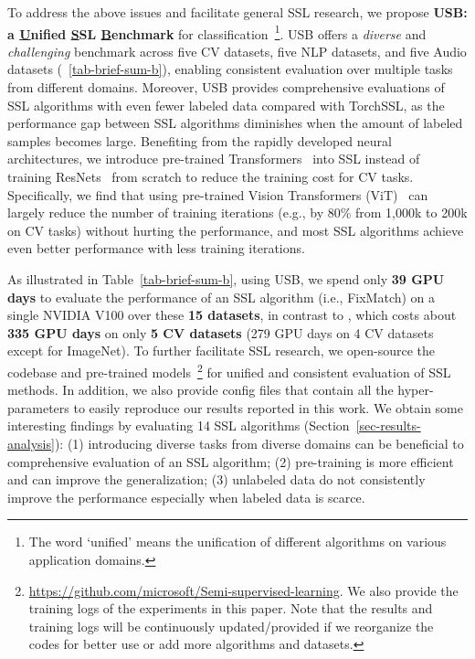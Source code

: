 \documentclass{article}
\newcommand{\revision}[1]{{\color{black}{#1}}}
\begin{document}
 

To address the above issues and facilitate general SSL research, we propose \textbf{USB: a \underline{U}nified \underline{S}SL \underline{B}enchmark} for classification~\footnote{The word `unified' means the unification of different algorithms on various application domains.}.
USB offers a \emph{diverse} and \emph{challenging} benchmark across five CV datasets, five NLP datasets, and five Audio datasets (\tablename ~\ref{tab-brief-sum-b}), enabling consistent evaluation over multiple tasks from different domains. Moreover, USB provides comprehensive evaluations of SSL algorithms with even fewer labeled data compared with TorchSSL, as the performance gap between SSL algorithms diminishes when the amount of labeled samples becomes large.
Benefiting from the rapidly developed neural architectures, we introduce pre-trained Transformers~\cite{vaswani2017attention} into SSL instead of training ResNets~\cite{he2016deep} from scratch to reduce the training cost for CV tasks.
Specifically, we find that using pre-trained Vision Transformers (ViT)~\cite{dosovitskiy2020image} can largely reduce the number of training iterations (e.g., by 80\% from 1,000k to 200k on CV tasks) without hurting the performance, and most SSL algorithms achieve even better performance with less training iterations.


As illustrated in Table~\ref{tab-brief-sum-b}, using USB, we spend only \textbf{39 GPU days} to evaluate the performance of an SSL algorithm (i.e., FixMatch) on a single NVIDIA V100 over these \textbf{15 datasets}, in contrast to \revision{TorchSSL}, which costs about \textbf{335 GPU days} on only \textbf{5 CV datasets} (279 GPU days on 4 CV datasets except for ImageNet).
To further facilitate SSL research, we open-source the codebase and pre-trained models~\footnote{\url{https://github.com/microsoft/Semi-supervised-learning}. We also provide the training logs of the experiments in this paper. Note that the results and training logs will be continuously updated/provided if we reorganize the codes for better use or add more algorithms and datasets. \revision{Microsoft Research Asia (MSRA) will provide both the support and resources for future updates.} } for unified and consistent evaluation of SSL methods. In addition, we also provide config files that contain all the hyper-parameters to easily reproduce our results reported in this work. We obtain some interesting findings by evaluating 14 SSL algorithms (Section~\ref{sec-results-analysis}): (1) introducing diverse tasks from diverse domains can be beneficial to comprehensive evaluation of an SSL algorithm; (2) pre-training is more efficient and can improve the generalization; (3) unlabeled data do not consistently improve the performance especially when labeled data is scarce.
\end{document}
